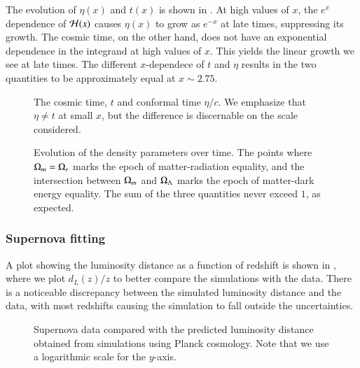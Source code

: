 The evolution of $\eta(x)$ and $t(x)$ is shown in . At high values of $x$, the $e^x$ dependence of $\mathcal{H}(x)$ causes $\eta(x)$ to grow as $e^{-x}$ at late times, suppressing its growth. The cosmic time, on the other hand, does not have an exponential dependence in the integrand at high values of $x$. This yields the linear growth we see at late times. The different $x$-dependece of $t$ and $\eta$ results in the two quantities to be approximately equal at $x\sim2.75$.    


\begin{figure}[ht!]
    \caption{The cosmic time, $t$ and conformal time $\eta/c$. We emphasize that $\eta\neq t$ at small $x$, but the difference is discernable on the scale considered.}
    \label{fig:M1:results:t_and_eta_c}
\end{figure}


\begin{figure}[ht!]
    \caption{Evolution of the density parameters over time. The points where $\Omega_{m}=\Omega_{r}$ marks the epoch of matter-radiation equality, and the intersection between $\Omega_{m}$ and $\Omega_{\Lambda}$ marks the epoch of matter-dark energy equality. The sum of the three quantities never exceed $1$, as expected.}
    \label{fig:M1:results:omega_i_of_x}
\end{figure}



\subsubsection{Supernova fitting}

A plot showing the luminosity distance as a function of redshift is shown in , where we plot $d_L(z)/z$ to better compare the simulations with the data. There is a noticeable discrepancy between the simulated luminosity distance and the data, with most redshifts causing the simulation to fall outside the uncertainties.       
\begin{figure}[ht!]
    \caption{Supernova data compared with the predicted luminosity distance obtained from simulations using Planck cosmology. Note that we use a logarithmic scale for the $y$-axis.}
    \label{fig:M1:results:dL_z_compare_planck}
\end{figure}

